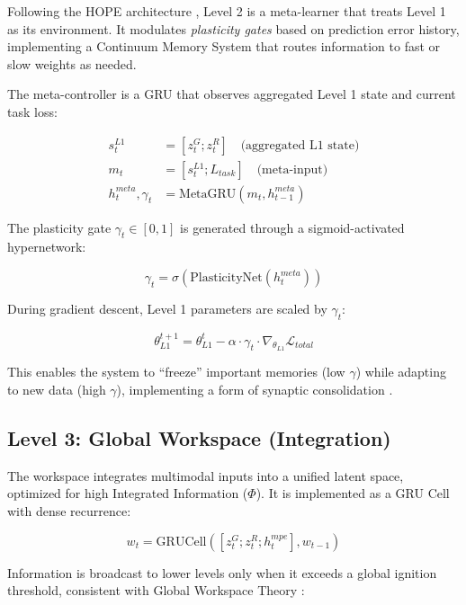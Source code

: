 \documentclass[11pt]{article}
\begin{document}
Following the HOPE architecture \cite{behrouz2025}, Level 2 is a meta-learner that treats Level 1 as its environment. It modulates \textit{plasticity gates} based on prediction error history, implementing a Continuum Memory System that routes information to fast or slow weights as needed.

The meta-controller is a GRU that observes aggregated Level 1 state and current task loss:

\begin{align}
s_t^{L1} &= [z_t^G ; z_t^R] \quad \text{(aggregated L1 state)} \\
m_t &= [s_t^{L1} ; L_{task}] \quad \text{(meta-input)} \\
h_t^{meta}, \gamma_t &= \text{MetaGRU}(m_t, h_{t-1}^{meta})
\end{align}

The plasticity gate $\gamma_t \in [0,1]$ is generated through a sigmoid-activated hypernetwork:

\begin{equation}
\gamma_t = \sigma(\text{PlasticityNet}(h_t^{meta}))
\end{equation}

During gradient descent, Level 1 parameters are scaled by $\gamma_t$:

\begin{equation}
\theta_{L1}^{t+1} = \theta_{L1}^t - \alpha \cdot \gamma_t \cdot \nabla_{\theta_{L1}} \mathcal{L}_{total}
\end{equation}

This enables the system to ``freeze'' important memories (low $\gamma$) while adapting to new data (high $\gamma$), implementing a form of synaptic consolidation \cite{mccloskey1989}.

\subsection{Level 3: Global Workspace (Integration)}

The workspace integrates multimodal inputs into a unified latent space, optimized for high Integrated Information ($\Phi$). It is implemented as a GRU Cell with dense recurrence:

\begin{equation}
w_t = \text{GRUCell}([z_t^G ; z_t^R ; h_t^{mpe}], w_{t-1})
\end{equation}

Information is broadcast to lower levels only when it exceeds a global ignition threshold, consistent with Global Workspace Theory \cite{baars1988}:
\end{document}
